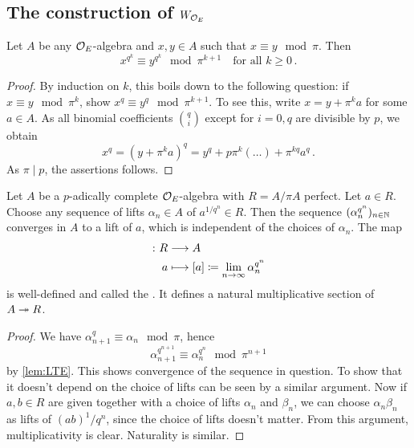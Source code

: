 \subsection{The construction of \texorpdfstring{$W_{\mathcal{O}_E}$}{W}}
\begin{lem}\label{lem:LTE}
	Let $A$ be any $\mathcal{O}_E$-algebra and $x,y\in A$ such that $x\equiv y\mod \pi$. Then
	\begin{equation*}
		x^{q^k}\equiv y^{q^k}\mod \pi^{k+1}\quad\text{for all }k\geq 0\,.
	\end{equation*}
\end{lem}
\begin{proof}
	By induction on $k$, this boils down to the following question: if $x\equiv y\mod \pi^k$, show $x^q\equiv y^q\mod \pi^{k+1}$. To see this, write $x=y+\pi^ka$ for some $a\in A$. As all binomial coefficients $\binom{q}{i}$ except for $i=0,q$ are divisible by $p$, we obtain 
	\begin{equation*}
		x^q=(y+\pi^ka)^q=y^q+p\pi^k(\ldots)+\pi^{kq}a^q\,.
	\end{equation*}
	As $\pi\mid p$, the assertions follows.
\end{proof}
\begin{deflem}\label{deflem:Teichmüller}
	Let $A$ be a $p$-adically complete $\mathcal{O}_E$-algebra with $R=A/\pi A$ perfect. Let $a\in R$. Choose any sequence of lifts $\alpha_n\in A$ of $a^{1/q^n}\in R$. Then the sequence $(\alpha_n^{q^n})_{n\in \mathbb{N}}$ converges in $A$ to a lift of $a$, which is independent of the choices of $\alpha_n$. The map
	\begin{align*}
		[-]\colon R&\morphism A\\
		a&\longmapsto [a]\coloneqq\lim_{n\to\infty}\alpha_n^{q^n}
	\end{align*}
	is well-defined and called the . It defines a natural multiplicative section of $A\epimorphism R$.
\end{deflem}
\begin{proof}
	We have $\alpha_{n+1}^q\equiv \alpha_n\mod \pi$, hence
	\begin{equation*}
		\alpha_{n+1}^{q^{n+1}}\equiv \alpha_n^{q^n}\mod \pi^{n+1}
	\end{equation*}
	by \cref{lem:LTE}. This shows convergence of the sequence in question. To show that it doesn't depend on the choice of lifts can be seen by a similar argument. Now if $a,b\in R$ are given together with a choice of lifts $\alpha_n$ and $\beta_n$, we can choose $\alpha_n\beta_n$ as lifts of $(ab)^1/q^n$, since the choice of lifts doesn't matter. From this argument, multiplicativity is clear. Naturality is similar.
\end{proof}
